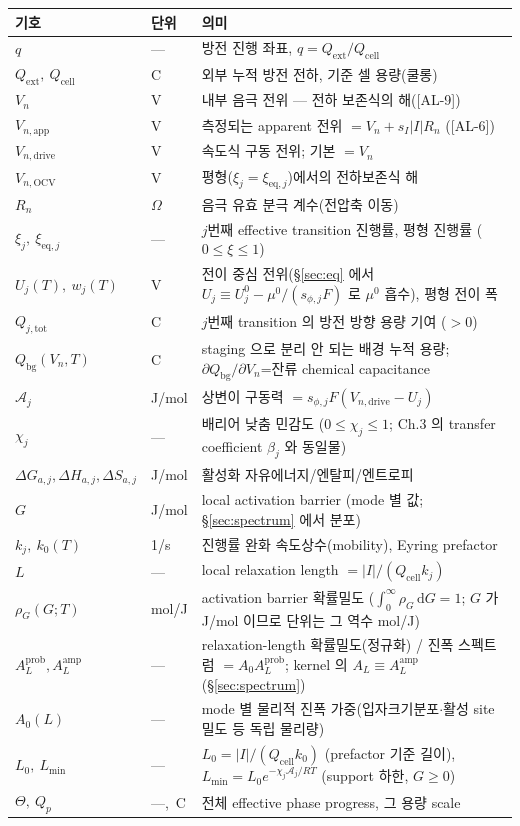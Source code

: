 \documentclass[11pt,a4paper]{article}
\newcommand{\dd}{\mathrm{d}}
\newcommand{\eq}{\mathrm{eq}}
\newcommand{\app}{\mathrm{app}}
\newcommand{\drive}{\mathrm{drive}}
\newcommand{\bg}{\mathrm{bg}}
\newcommand{\cell}{\mathrm{cell}}
\newcommand{\ext}{\mathrm{ext}}
\newcommand{\OCV}{\mathrm{OCV}}
\newcommand{\tot}{\mathrm{tot}}
\newcommand{\AL}[1]{\textsf{[AL-#1]}}
\begin{document}
\begin{longtable}{p{} p{} p{}}
\toprule 기호 & 단위 & 의미 \\ \midrule \endhead
$q$ & --- & 방전 진행 좌표, $q=Q_\ext/Q_\cell$ \\
$Q_\ext,\ Q_\cell$ & C & 외부 누적 방전 전하, 기준 셀 용량(쿨롱) \\
$V_n$ & V & 내부 음극 전위 — 전하 보존식의 해(\AL{9}) \\
$V_{n,\app}$ & V & 측정되는 apparent 전위 $=V_n+s_I|I|R_n$ (\AL{6}) \\
$V_{n,\drive}$ & V & 속도식 구동 전위; 기본 $=V_n$ \\
$V_{n,\OCV}$ & V & 평형($\xi_j=\xi_{\eq,j}$)에서의 전하보존식 해 \\
$R_n$ & $\Omega$ & 음극 유효 분극 계수(전압축 이동) \\
$\xi_j,\ \xi_{\eq,j}$ & --- & $j$번째 effective transition 진행률, 평형 진행률 ($0\!\le\!\xi\!\le\!1$) \\
$U_j(T),\ w_j(T)$ & V & 전이 중심 전위(\S\ref{sec:eq} 에서 $U_j\equiv U_j^0-\mu^0/(s_{\phi,j}F)$ 로 $\mu^0$ 흡수), 평형 전이 폭 \\
$Q_{j,\tot}$ & C & $j$번째 transition 의 방전 방향 용량 기여 ($>0$) \\
$Q_\bg(V_n,T)$ & C & staging 으로 분리 안 되는 배경 누적 용량; $\partial Q_\bg/\partial V_n$=잔류 chemical capacitance \\
$\mathcal A_j$ & J/mol & 상변이 구동력 $=s_{\phi,j}F(V_{n,\drive}-U_j)$ \\
$\chi_j$ & --- & 배리어 낮춤 민감도 ($0\le\chi_j\le1$; Ch.3 의 transfer coefficient $\beta_j$ 와 동일물) \\
$\Delta G_{a,j},\Delta H_{a,j},\Delta S_{a,j}$ & J/mol & 활성화 자유에너지/엔탈피/엔트로피 \\
$G$ & J/mol & local activation barrier (mode 별 값; \S\ref{sec:spectrum} 에서 분포) \\
$k_j,\ k_0(T)$ & 1/s & 진행률 완화 속도상수(mobility), Eyring prefactor \\
$L$ & --- & local relaxation length $=|I|/(Q_\cell k_j)$ \\
$\rho_G(G;T)$ & mol/J & activation barrier 확률밀도 ($\int_0^\infty\rho_G\,\dd G=1$; $G$ 가 J/mol 이므로 단위는 그 역수 mol/J) \\
$A_L^{\mathrm{prob}},A_L^{\mathrm{amp}}$ & --- & relaxation-length 확률밀도(정규화) / 진폭 스펙트럼 $=A_0 A_L^{\mathrm{prob}}$; kernel 의 $A_L\equiv A_L^{\mathrm{amp}}$ (\S\ref{sec:spectrum}) \\
$A_0(L)$ & --- & mode 별 물리적 진폭 가중(입자크기분포$\cdot$활성 site 밀도 등 독립 물리량) \\
$L_0,\ L_{\min}$ & --- & $L_0=|I|/(Q_\cell k_0)$ (prefactor 기준 길이), $L_{\min}=L_0 e^{-\chi_j\mathcal A_j/RT}$ (support 하한, $G\!\ge\!0$) \\
$\Theta,\ Q_p$ & ---,\ C & 전체 effective phase progress, 그 용량 scale \\
\bottomrule
\end{longtable}
\end{document}
